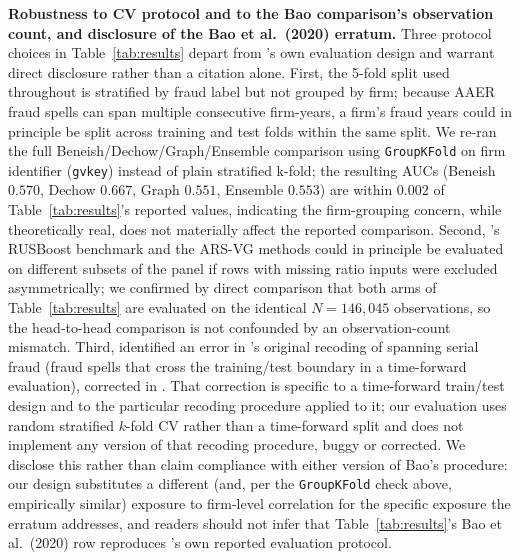 \documentclass[12pt]{article}
\begin{document}
\textbf{Robustness to CV protocol and to the Bao comparison's observation
count, and disclosure of the Bao et al.\ (2020) erratum.} Three
protocol choices in Table~\ref{tab:results} depart from
\citet{bao2020}'s own evaluation design and warrant direct disclosure
rather than a citation alone.  First, the 5-fold split used throughout is
stratified by fraud label but not grouped by firm; because AAER fraud
spells can span multiple consecutive firm-years, a firm's fraud years
could in principle be split across training and test folds within the
same split.  We re-ran the full Beneish/Dechow/Graph/Ensemble comparison
using \texttt{GroupKFold} on firm identifier (\texttt{gvkey}) instead of
plain stratified k-fold; the resulting AUCs (Beneish $0.570$, Dechow
$0.667$, Graph $0.551$, Ensemble $0.553$) are within $0.002$ of
Table~\ref{tab:results}'s reported values, indicating the firm-grouping
concern, while theoretically real, does not materially affect the
reported comparison.  Second, \citet{bao2020}'s RUSBoost benchmark and
the ARS-VG methods could in principle be evaluated on different subsets
of the panel if rows with missing ratio inputs were excluded
asymmetrically; we confirmed by direct comparison that both arms of
Table~\ref{tab:results} are evaluated on the identical $N=146{,}045$
observations, so the head-to-head comparison is not confounded by an
observation-count mismatch.  Third, \citet{walker2021a,walker2021b}
identified an error in \citet{bao2020}'s original recoding of
spanning serial fraud (fraud spells that cross the training/test
boundary in a time-forward evaluation), corrected in
\citet{bao2022erratum}.  That correction is specific to a
time-forward train/test design and to the particular recoding
procedure \citet{bao2020} applied to it; our evaluation uses random
stratified $k$-fold CV rather than a time-forward split and does not
implement any version of that recoding procedure, buggy or corrected.
We disclose this rather than claim compliance with either version of
Bao's procedure: our design substitutes a different (and, per the
\texttt{GroupKFold} check above, empirically similar) exposure to
firm-level correlation for the specific exposure the erratum
addresses, and readers should not infer that Table~\ref{tab:results}'s
Bao et al.\ (2020) row reproduces \citeauthor{bao2020}'s own reported
evaluation protocol.
\end{document}
